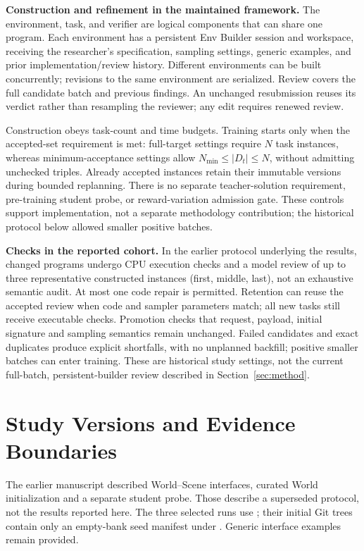 \textbf{Construction and refinement in the maintained framework.}\quad
\label{app:constructionrefinement}
The environment, task, and verifier are logical components that can share
one program. Each environment has a persistent Env Builder session and
workspace, receiving the researcher's specification, sampling settings,
generic examples, and prior implementation/review history. Different
environments can be built concurrently; revisions to the same environment
are serialized. Review covers the full candidate batch and previous findings.
An unchanged resubmission reuses its verdict rather than resampling the
reviewer; any edit requires renewed review.

Construction obeys task-count and time budgets. Training starts only when
the accepted-set requirement is met: full-target settings require $N$ task
instances, whereas minimum-acceptance settings allow
$N_{\min}\leq |D_t|\leq N$, without admitting unchecked triples. Already
accepted instances retain their immutable versions during bounded replanning.
There is no separate teacher-solution requirement, pre-training student probe,
or reward-variation admission gate. These controls support implementation,
not a separate methodology contribution; the historical protocol below
allowed smaller positive batches.

\textbf{Checks in the reported cohort.}\quad
In the earlier protocol underlying the results, changed programs undergo CPU execution checks and a model review of up to three representative constructed instances (first, middle, last), not an exhaustive semantic audit. At most one code repair is permitted. Retention can reuse the accepted review when code and sampler parameters match; all new tasks still receive executable checks. Promotion checks that request, payload, initial signature and sampling semantics remain unchanged. Failed candidates and exact duplicates produce explicit shortfalls, with no unplanned backfill; positive smaller batches can enter training. These are historical study settings, not the current full-batch, persistent-builder review described in Section~\ref{sec:method}.

\section{Study Versions and Evidence Boundaries}
\label{app:versions}

The earlier manuscript described World--Scene interfaces, curated World initialization and a separate student probe. Those describe a superseded protocol, not the results reported here. The three selected runs use ; their initial Git trees contain only an empty-bank seed manifest under . Generic interface examples remain provided.

